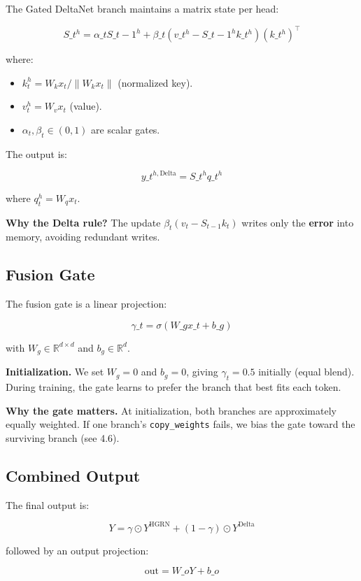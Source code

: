 The Gated DeltaNet branch maintains a matrix state per head:

\[
S\_t^h = \alpha\_t S\_{t-1}^h + \beta\_t (v\_t^h - S\_{t-1}^h k\_t^h) (k\_t^h)^\top
\tag{4.4}
\]

where:

\begin{itemize}
\item $k_t^h = W_k x_t / \|W_k x_t\|$ (normalized key).
\item $v_t^h = W_v x_t$ (value).
\item $\alpha_t, \beta_t \in (0, 1)$ are scalar gates.

\end{itemize}
The output is:

\[
y\_t^{h, \text{Delta}} = S\_t^h q\_t^h
\tag{4.5}
\]

where $q_t^h = W_q x_t$.

\textbf{Why the Delta rule?} The update $\beta_t (v_t - S_{t-1} k_t)$ writes only 
the \textbf{error} into memory, avoiding redundant writes.

\subsection{Fusion Gate}

The fusion gate is a linear projection:

\[
\gamma\_t = \sigma(W\_g x\_t + b\_g)
\tag{4.6}
\]

with $W_g \in \mathbb{R}^{d \times d}$ and $b_g \in \mathbb{R}^d$.

\textbf{Initialization.} We set $W_g = 0$ and $b_g = 0$, giving 
$\gamma_t = 0.5$ initially (equal blend). During training, the gate learns 
to prefer the branch that best fits each token.

\textbf{Why the gate matters.} At initialization, both branches are 
approximately equally weighted. If one branch's \texttt{copy\_weights} fails, we 
bias the gate toward the surviving branch (see  4.6).

\subsection{Combined Output}

The final output is:

\[
Y = \gamma \odot Y^\text{HGRN} + (1 - \gamma) \odot Y^\text{Delta}
\tag{4.7}
\]

followed by an output projection:

\[
\text{out} = W\_o Y + b\_o
\tag{4.8}
\]

